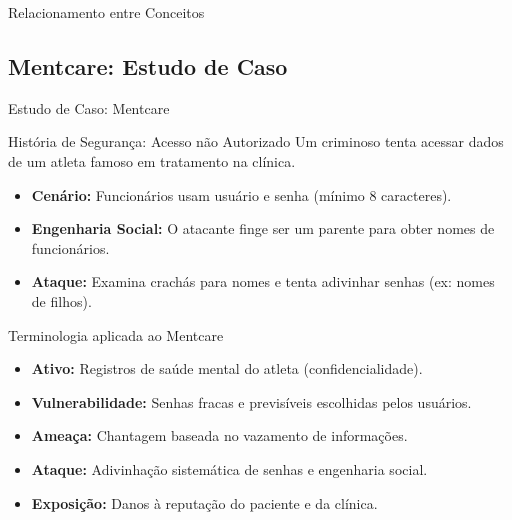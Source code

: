 \documentclass[aspectratio=169]{beamer}
\begin{document}
\begin{frame}{Relacionamento entre Conceitos}
    \centering
\end{frame}

\subsection{Mentcare: Estudo de Caso}
\begin{frame}{Estudo de Caso: Mentcare}
    \begin{block}{História de Segurança: Acesso não Autorizado}
        Um criminoso tenta acessar dados de um atleta famoso em tratamento na clínica.
    \end{block}
    \begin{itemize}
        \item \textbf{Cenário:} Funcionários usam usuário e senha (mínimo 8 caracteres).
        \item \textbf{Engenharia Social:} O atacante finge ser um parente para obter nomes de funcionários.
        \item \textbf{Ataque:} Examina crachás para nomes e tenta adivinhar senhas (ex: nomes de filhos).
    \end{itemize}
\end{frame}

\begin{frame}{Terminologia aplicada ao Mentcare}
    \begin{itemize}
        \item \textbf{Ativo:} Registros de saúde mental do atleta (confidencialidade).
        \item \textbf{Vulnerabilidade:} Senhas fracas e previsíveis escolhidas pelos usuários.
        \item \textbf{Ameaça:} Chantagem baseada no vazamento de informações.
        \item \textbf{Ataque:} Adivinhação sistemática de senhas e engenharia social.
        \item \textbf{Exposição:} Danos à reputação do paciente e da clínica.
    \end{itemize}
\end{frame}
\end{document}
